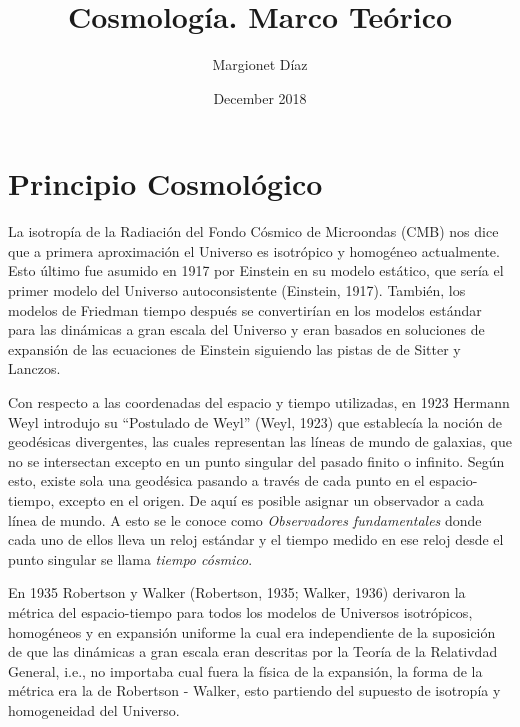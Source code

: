 \documentclass[11pt]{article}
\title{Cosmología. Marco Teórico}
\author{Margionet Díaz}
\date{December 2018}
\begin{document}
\sloppy %


\maketitle

\section{Principio Cosmológico}

La isotropía de la Radiación del Fondo Cósmico de Microondas (CMB) nos dice que a primera aproximación el Universo es isotrópico y homogéneo actualmente. Esto último fue asumido en 1917 por Einstein en su modelo estático, que sería el primer modelo del Universo autoconsistente (Einstein, 1917). También, los modelos de Friedman tiempo después se convertirían en los modelos estándar para las dinámicas a gran escala del Universo y eran basados en soluciones de expansión de las ecuaciones de Einstein siguiendo las pistas de de Sitter y Lanczos.



Con respecto a las coordenadas del espacio y tiempo utilizadas, en 1923 Hermann Weyl introdujo su ``Postulado de Weyl'' (Weyl, 1923) que establecía la noción de geodésicas divergentes, las cuales representan las líneas de mundo de galaxias, que no se intersectan excepto en un punto singular del pasado finito o infinito. Según esto, existe sola una geodésica pasando a través de cada punto en el espacio-tiempo, excepto en el origen.  De aquí es posible asignar un observador a cada línea de mundo. A esto se le conoce como {\textit{Observadores fundamentales}} donde cada uno de ellos lleva un reloj estándar y el tiempo medido en ese reloj desde el punto singular se llama {\textit{tiempo cósmico}}.

En 1935 Robertson y Walker (Robertson, 1935; Walker, 1936) derivaron la métrica del espacio-tiempo para todos los modelos de Universos isotrópicos, homogéneos y en expansión uniforme la cual era independiente de la suposición de que las dinámicas a gran escala eran descritas por la Teoría de la Relativdad General, i.e., no importaba cual fuera la física de la expansión,  la forma de la métrica era la de Robertson - Walker, esto partiendo del supuesto de isotropía y homogeneidad del Universo. 
\end{document}
